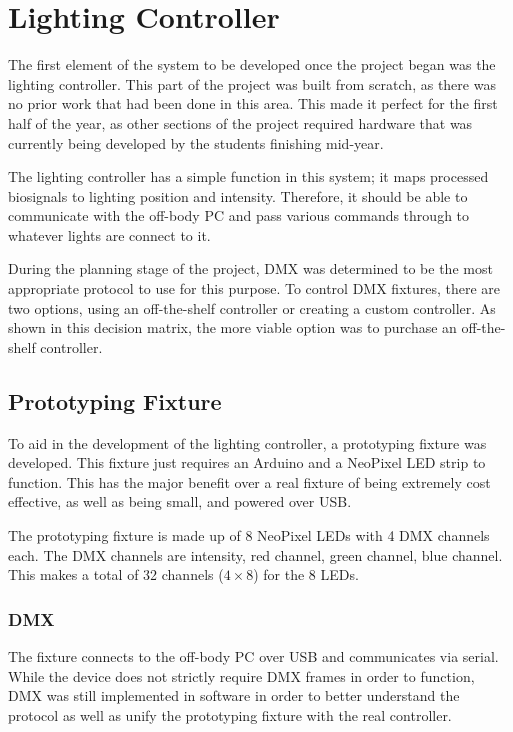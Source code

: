 \chapter{Lighting Controller}
The first element of the system to be developed once the project began was the lighting controller.
This part of the project was built from scratch, as there was no prior work that had been done in this area.
This made it perfect for the first half of the year,
as other sections of the project required hardware that was currently being developed by the students finishing mid-year.

The lighting controller has a simple function in this system; it maps processed biosignals to lighting position and intensity.
Therefore, it should be able to communicate with the off-body PC and pass various commands through to whatever lights are connect to it.

During the planning stage of the project, DMX was determined to be the most appropriate protocol to use for this purpose.
To control DMX fixtures, there are two options, using an off-the-shelf controller or creating a custom controller.
As shown in this decision matrix, the more viable option was to purchase an off-the-shelf controller.

\section{Prototyping Fixture}
To aid in the development of the lighting controller, a prototyping fixture was developed.
This fixture just requires an Arduino and a NeoPixel LED strip to function.
This has the major benefit over a real fixture of being extremely cost effective, as well as being small, and powered over USB.

The prototyping fixture is made up of 8 NeoPixel LEDs with 4 DMX channels each.
The DMX channels are intensity, red channel, green channel, blue channel.
This makes a total of 32 channels (\(4 \times 8\)) for the 8 LEDs.

\subsection{DMX}
The fixture connects to the off-body PC over USB and communicates via serial.
While the device does not strictly require DMX frames in order to function,
DMX was still implemented in software in order to better understand the protocol as well as unify the prototyping fixture with the real controller.

